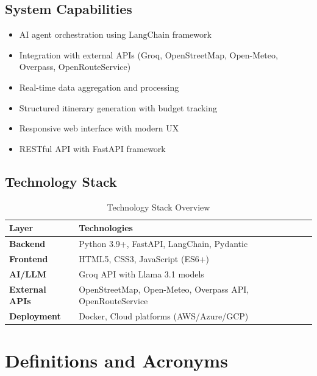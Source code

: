 \documentclass[12pt,a4paper]{report}
\begin{document}
\subsection{System Capabilities}

\begin{itemize}[leftmargin=*]
    \item AI agent orchestration using LangChain framework
    \item Integration with external APIs (Groq, OpenStreetMap, Open-Meteo, Overpass, OpenRouteService)
    \item Real-time data aggregation and processing
    \item Structured itinerary generation with budget tracking
    \item Responsive web interface with modern UX
    \item RESTful API with FastAPI framework
\end{itemize}

\subsection{Technology Stack}

\begin{table}[H]
\centering
\begin{tabular}{|l|p{10cm}|}
\hline
\textbf{Layer} & \textbf{Technologies} \\
\hline
\textbf{Backend} & Python 3.9+, FastAPI, LangChain, Pydantic \\
\hline
\textbf{Frontend} & HTML5, CSS3, JavaScript (ES6+) \\
\hline
\textbf{AI/LLM} & Groq API with Llama 3.1 models \\
\hline
\textbf{External APIs} & OpenStreetMap, Open-Meteo, Overpass API, OpenRouteService \\
\hline
\textbf{Deployment} & Docker, Cloud platforms (AWS/Azure/GCP) \\
\hline
\end{tabular}
\caption{Technology Stack Overview}
\label{tab:techstack}
\end{table}

\section{Definitions and Acronyms}
\end{document}
